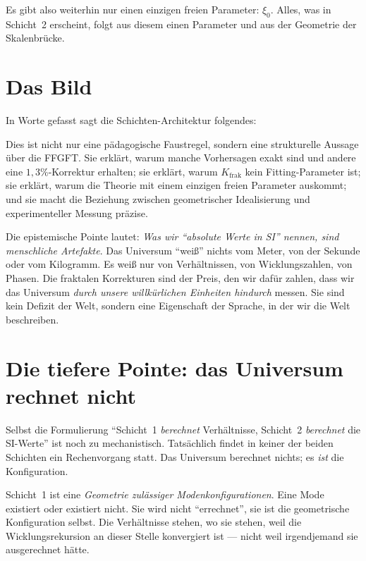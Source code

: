Es gibt also weiterhin nur einen einzigen freien Parameter: $\xi_{0}$.
Alles, was in Schicht~2 erscheint, folgt aus diesem einen Parameter und
aus der Geometrie der Skalenbrücke.

\section{Das Bild}

In Worte gefasst sagt die Schichten-Architektur folgendes:

\begin{center}
\end{center}

Dies ist nicht nur eine pädagogische Faustregel, sondern eine
strukturelle Aussage über die FFGFT. Sie erklärt, warum manche
Vorhersagen exakt sind und andere eine $1{,}3\%$-Korrektur erhalten;
sie erklärt, warum $K_{\mathrm{frak}}$ kein Fitting-Parameter ist; sie
erklärt, warum die Theorie mit einem einzigen freien Parameter
auskommt; und sie macht die Beziehung zwischen geometrischer
Idealisierung und experimenteller Messung präzise.

Die epistemische Pointe lautet: \emph{Was wir ``absolute Werte in SI''
nennen, sind menschliche Artefakte}. Das Universum ``weiß'' nichts vom
Meter, von der Sekunde oder vom Kilogramm. Es weiß nur von Verhältnissen,
von Wicklungszahlen, von Phasen. Die fraktalen Korrekturen sind der Preis,
den wir dafür zahlen, dass wir das Universum \emph{durch unsere willkürlichen
Einheiten hindurch} messen. Sie sind kein Defizit der Welt, sondern eine
Eigenschaft der Sprache, in der wir die Welt beschreiben.

\section{Die tiefere Pointe: das Universum rechnet nicht}

Selbst die Formulierung ``Schicht~1 \emph{berechnet} Verhältnisse,
Schicht~2 \emph{berechnet} die SI-Werte'' ist noch zu mechanistisch.
Tatsächlich findet in keiner der beiden Schichten ein Rechenvorgang
statt. Das Universum berechnet nichts; es \emph{ist} die Konfiguration.

Schicht~1 ist eine \emph{Geometrie zulässiger Modenkonfigurationen}.
Eine Mode existiert oder existiert nicht. Sie wird nicht ``errechnet'',
sie ist die geometrische Konfiguration selbst. Die Verhältnisse stehen,
wo sie stehen, weil die Wicklungsrekursion an dieser Stelle konvergiert
ist --- nicht weil irgendjemand sie ausgerechnet hätte.

